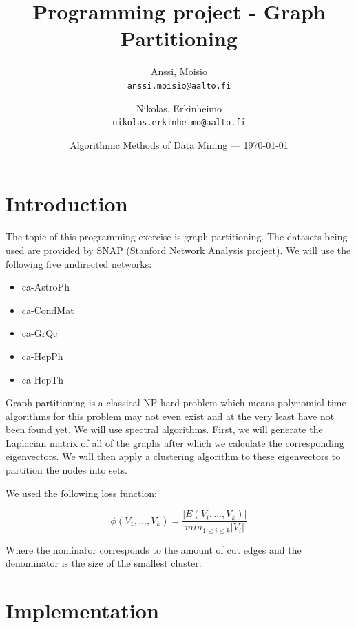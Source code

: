 \documentclass{article}
\title{Programming project - Graph Partitioning} %
\author{
  Anssi, Moisio\\
  \texttt{anssi.moisio@aalto.fi}
  \and
  Nikolas, Erkinheimo\\
  \texttt{nikolas.erkinheimo@aalto.fi}
}
\date{Algorithmic Methods of Data Mining --- \today} %
\begin{document}
\maketitle %


\section*{Introduction} %

The topic of this programming exercise is graph partitioning. The datasets being used are provided by SNAP (Stanford Network Analysis project). We will use the following five undirected networks:

\begin{itemize}
	\item ca-AstroPh
	\item ca-CondMat
	\item ca-GrQc
	\item ca-HepPh
	\item ca-HepTh
\end{itemize}

Graph partitioning is a classical NP-hard problem which means polynomial time algorithms for this problem may not even exist and at the very least have not been found yet. We will use spectral algorithms. First, we will generate the Laplacian matrix of all of the graphs after which we calculate the corresponding eigenvectors. We will then apply a clustering algorithm to these eigenvectors to partition the nodes into sets.

We used the following loss function:

\begin{equation}
	\phi(V_1,...,V_k) = \frac{\lvert{E(V_i,...,V_k)}\rvert}{min_{1\leq{i}\leq{k}}\lvert{V_i}\rvert}
\end{equation}

Where the nominator corresponds to the amount of cut edges and the denominator is the size of the smallest cluster. 

\section{Implementation} %
\end{document}
